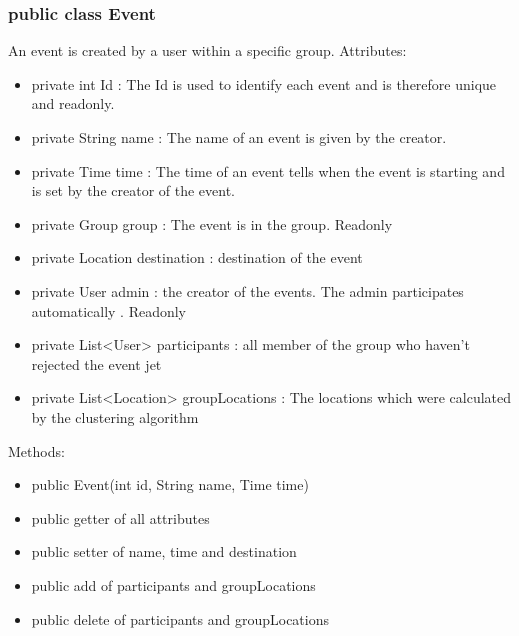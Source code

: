 	\subsubsection{public class Event}
	An event is created by a user within a specific group.
	\newline Attributes:
	\begin{itemize}
	\item private  int Id : The Id is used to identify each event and is therefore unique and readonly.
	\item private String name : The name of an event is given by the creator.
	\item private Time time : The time of an event tells when the event is starting and is set by the creator of the event.
	\item private Group group : The event is in the group. Readonly
	\item private Location destination : destination of the event
	\item private User admin : the creator of the events. The admin participates automatically . Readonly
	\item private List<User> participants : all member of the group who haven't rejected the event jet
	\item private List<Location> groupLocations : The locations which were calculated by the clustering algorithm
	\end{itemize}
	Methods:
	\begin{itemize}
	\item public Event(int id, String name, Time time)
	\item public getter of all attributes
	\item public setter of name, time and destination
	\item public add of participants and groupLocations
	\item public delete of participants and groupLocations
	\end{itemize}

